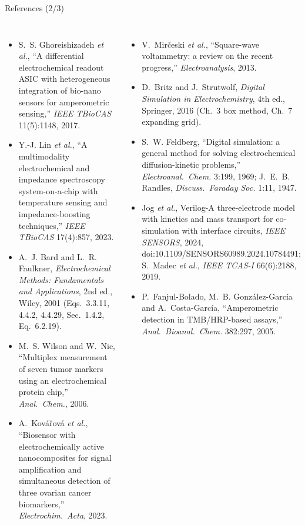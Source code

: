 \documentclass[10pt, aspectratio=169]{beamer}
\begin{document}
\begin{frame}{References (2/3)}
\vspace{-0.2cm}
{\tiny
{}
\setlength{\leftmargini}{2.0em}
\begin{columns}[T]
\begin{itemize}\setlength{\itemsep}{2pt}\setlength{\parskip}{0pt}
  \item[{[11]}] S.~S. Ghoreishizadeh \emph{et al.}, ``A differential electrochemical readout ASIC with heterogeneous integration of bio-nano sensors for amperometric sensing,'' \emph{IEEE TBioCAS} 11(5):1148, 2017.
  \item[{[12]}] Y.-J. Lin \emph{et al.}, ``A multimodality electrochemical and impedance spectroscopy system-on-a-chip with temperature sensing and impedance-boosting techniques,'' \emph{IEEE TBioCAS} 17(4):857, 2023.
  \item[{[13]}] A.~J. Bard and L.~R. Faulkner, \emph{Electrochemical Methods: Fundamentals and Applications}, 2nd ed., Wiley, 2001 (Eqs.\ 3.3.11, 4.4.2, 4.4.29, Sec.\ 1.4.2, Eq.\ 6.2.19).
  \item[{[14]}] M.~S. Wilson and W.~Nie, ``Multiplex measurement of seven tumor markers using an electrochemical protein chip,'' \emph{Anal.\ Chem.}, 2006.
  \item[{[15]}] A.~Kov\'a\v{r}ov\'a \emph{et al.}, ``Biosensor with electrochemically active nanocomposites for signal amplification and simultaneous detection of three ovarian cancer biomarkers,'' \emph{Electrochim.\ Acta}, 2023.
\end{itemize}
\begin{itemize}\setlength{\itemsep}{2pt}\setlength{\parskip}{0pt}
  \item[{[16]}] V.~Mir\v{c}eski \emph{et al.}, ``Square-wave voltammetry: a review on the recent progress,'' \emph{Electroanalysis}, 2013.
  \item[{[17]}] D.~Britz and J.~Strutwolf, \emph{Digital Simulation in Electrochemistry}, 4th ed., Springer, 2016 (Ch.\ 3 box method, Ch.\ 7 expanding grid).
  \item[{[18]}] S.~W. Feldberg, ``Digital simulation: a general method for solving electrochemical diffusion-kinetic problems,'' \emph{Electroanal.\ Chem.} 3:199, 1969; J.~E.~B. Randles, \emph{Discuss.\ Faraday Soc.} 1:11, 1947.
  \item[{[19]}] Jog \emph{et al.}, Verilog-A three-electrode model with kinetics and mass transport for co-simulation with interface circuits, \emph{IEEE SENSORS}, 2024, doi:10.1109/SENSORS60989.2024\allowbreak.10784491; S.~Madec \emph{et al.}, \emph{IEEE TCAS-I} 66(6):2188, 2019.
  \item[{[20]}] P.~Fanjul-Bolado, M.~B. Gonz\'alez-Garc\'ia and A.~Costa-Garc\'ia, ``Amperometric detection in TMB/HRP-based assays,'' \emph{Anal.\ Bioanal.\ Chem.} 382:297, 2005.
\end{itemize}
\end{columns}}
\end{frame}
\end{document}

